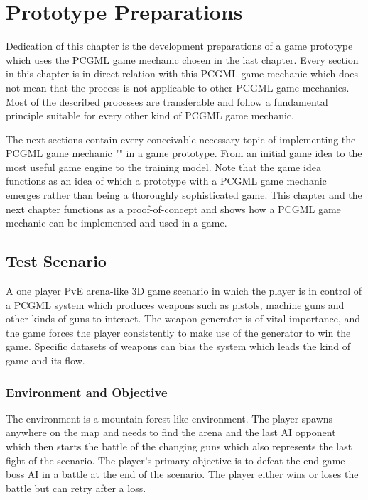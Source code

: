 \documentclass[MGS,Master,english]{twbook}%
\begin{document}
%
%
\clearpage
\chapter{Prototype Preparations} \label{chapter::gamePrototype}
Dedication of this chapter is the development preparations of a game prototype which uses the PCGML game mechanic chosen in the last chapter. Every section in this chapter is in direct relation with this PCGML game mechanic which does not mean that the process is not applicable to other PCGML game mechanics. Most of the described processes are transferable and follow a fundamental principle suitable for every other kind of PCGML game mechanic. 

The next sections contain every conceivable necessary topic of implementing the PCGML game mechanic "" in a game prototype. From an initial game idea to the most useful game engine to the training model. Note that the game idea functions as an idea of which a prototype with a PCGML game mechanic emerges rather than being a thoroughly sophisticated game. This chapter and the next chapter functions as a proof-of-concept and shows how a PCGML game mechanic can be implemented and used in a game.

\section{Test Scenario}
A one player \ac{PvE} arena-like 3D game scenario in which the player is in control of a PCGML system which produces weapons such as pistols, machine guns and other kinds of guns to interact. The weapon generator is of vital importance, and the game forces the player consistently to make use of the generator to win the game. Specific datasets of weapons can bias the system which leads the kind of game and its flow. 

\subsection{Environment and Objective}
The environment is a mountain-forest-like environment. The player spawns anywhere on the map and needs to find the arena and the last AI opponent which then starts the battle of the changing guns which also represents the last fight of the scenario. The player's primary objective is to defeat the end game boss AI in a battle at the end of the scenario. The player either wins or loses the battle but can retry after a loss.
\end{document}
